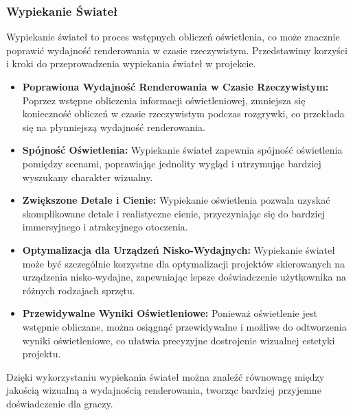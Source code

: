\subsubsection{Wypiekanie Świateł} \label{subsubsec:bakingLights}
Wypiekanie świateł to proces wstępnych obliczeń oświetlenia, co może znacznie poprawić wydajność renderowania w czasie rzeczywistym. Przedstawimy korzyści i kroki do przeprowadzenia wypiekania świateł w projekcie.
\begin{itemize}
    \item \textbf{Poprawiona Wydajność Renderowania w Czasie Rzeczywistym:} Poprzez wstępne obliczenia informacji oświetleniowej, zmniejsza się konieczność obliczeń w czasie rzeczywistym podczas rozgrywki, co przekłada się na płynniejszą wydajność renderowania.
    \item \textbf{Spójność Oświetlenia:} Wypiekanie świateł zapewnia spójność oświetlenia pomiędzy scenami, poprawiając jednolity wygląd i utrzymując bardziej wyszukany charakter wizualny.
    \item \textbf{Zwiększone Detale i Cienie: } Wypiekanie oświetlenia pozwala uzyskać skomplikowane detale i realistyczne cienie, przyczyniając się do bardziej immersyjnego i atrakcyjnego otoczenia.
    \item \textbf{Optymalizacja dla Urządzeń Nisko-Wydajnych:} Wypiekanie świateł może być szczególnie korzystne dla optymalizacji projektów skierowanych na urządzenia nisko-wydajne, zapewniając lepsze doświadczenie użytkownika na różnych rodzajach sprzętu.
    \item \textbf{Przewidywalne Wyniki Oświetleniowe:} Ponieważ oświetlenie jest wstępnie obliczane, można osiągnąć przewidywalne i możliwe do odtworzenia wyniki oświetleniowe, co ułatwia precyzyjne dostrojenie wizualnej estetyki projektu.
\end{itemize}
Dzięki wykorzystaniu wypiekania świateł można znaleźć równowagę między jakością wizualną a wydajnością renderowania, tworząc bardziej przyjemne doświadczenie dla graczy.
